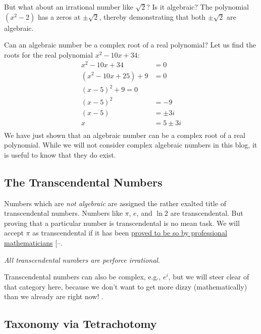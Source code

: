\documentclass[
  a4paper,
]{article}
\begin{document}
But what about an irrational number like \(\sqrt{2}\)? Is it algebraic?
The polynomial \((x^2 - 2)\) has a zeros at \(\pm\sqrt{2}\), thereby
demonstrating that both \(\pm\sqrt{2}\) are algebraic.

Can an algebraic number be a complex root of a real polynomial? Let us
find the roots for the real polynomial \(x^2 - 10x +34\): \[
\begin{aligned}
x^2 - 10x + 34 &= 0\\
(x^2 -10x + 25) + 9 &= 0\\
(x - 5)^2 + 9 = 0\\
(x - 5)^2 &= -9\\
(x - 5) &= \pm3i\\
x &= 5 \pm 3i\\
\end{aligned}
\] We have just shown that an algebraic number can be a complex root of
a real polynomial. While we will not consider complex algebraic numbers
in this blog, it is useful to know that they do exist.

\subsection{The Transcendental
Numbers}\label{the-transcendental-numbers}

Numbers which are \emph{not algebraic} are assigned the rather exalted
title of transcendental numbers. Numbers like
\href{https://www.wolframalpha.com/input?i=is+pi+transcendental}{\(\pi\)},
\href{https://www.wolframalpha.com/input?i=is+e+transcendental}{\(e\)},
and
\href{https://www.wolframalpha.com/input?i=is+ln\%282\%29+transcendental}{\(\ln 2\)}
are transcendental. But proving that a particular number is
transcendental is no mean task. We will accept \(\pi\) as transcendental
if it has been
\href{https://fermatslibrary.com/s/the-transcendence-of-pi}{proved to be
so by professional mathematicians}
{[}--\citeproc{ref-morris-jones-pearson-2022}{9}{]}.

\emph{All transcendental numbers are perforce irrational}.

Transcendental numbers can also be complex, e.g., \(e^{i}\), but we will
steer clear of that category here, because we don't want to get more
dizzy (mathematically) than we already are right now! 
\normalfont.

\subsection{Taxonomy via Tetrachotomy}\label{taxonomy-via-tetrachotomy}
\end{document}
